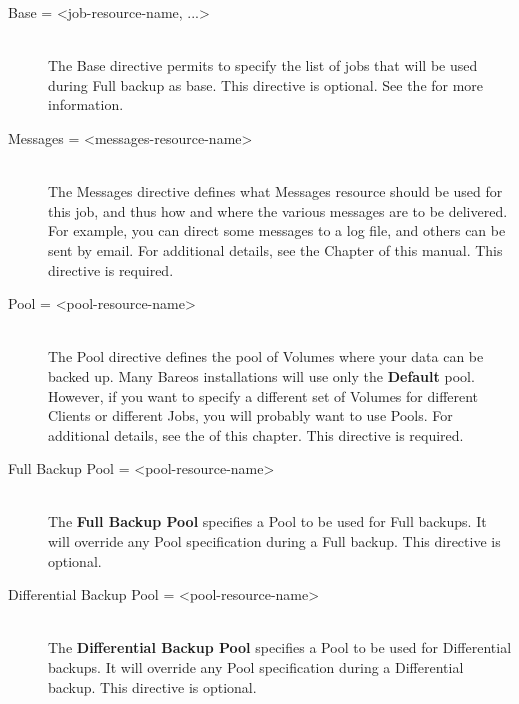 \begin{description}
\item [Base = {\textless}job-resource-name, ...{\textgreater}] \hfill \\
The Base directive permits to specify the list of jobs that will be used during
Full backup as base. This directive is optional. See the  for more information.

\item [Messages = {\textless}messages-resource-name{\textgreater}] \hfill \\
The Messages directive defines what Messages resource should be used for
this job, and thus how and where the various messages are to be
delivered.  For example, you can direct some messages to a log file, and
others can be sent by email.  For additional details, see the
 Chapter of this manual.  This
directive is required.

\item [Pool = {\textless}pool-resource-name{\textgreater}] \hfill \\
The Pool directive defines the pool of Volumes where your data can be
backed up.  Many Bareos installations will use only the {\bf Default}
pool.  However, if you want to specify a different set of Volumes for
different Clients or different Jobs, you will probably want to use
Pools.  For additional details, see the  
of this chapter.  This directive is required.

\item [Full Backup Pool = {\textless}pool-resource-name{\textgreater}] \hfill \\
The {\bf Full Backup Pool} specifies a Pool to be used for Full backups.
It will override any Pool specification during a Full backup.  This
directive is optional.

\item [Differential Backup Pool = {\textless}pool-resource-name{\textgreater}] \hfill \\
The {\bf Differential Backup Pool} specifies a Pool to be used for
Differential backups.  It will override any Pool specification during a
Differential backup.  This directive is optional.


\end{description}
